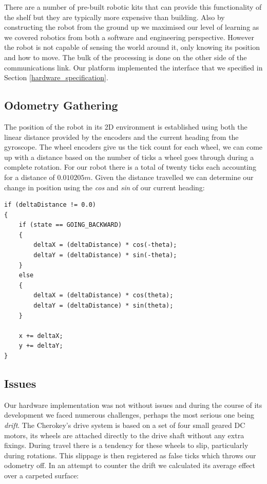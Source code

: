 \noindent
There are a number of pre-built robotic kits that can provide this functionality of the shelf but they are typically more expensive than building. Also by constructing the robot from the ground up we maximised our level of learning as we covered robotics from both a software and engineering perspective. However the robot is not capable of sensing the world around it, only knowing its position and how to move. The bulk of the processing is done on the other side of the communications link. Our platform implemented the interface that we specified in Section \ref{hardware_specification}.

\newpage

\subsection{Odometry Gathering}
\noindent
The position of the robot in its 2D environment is established using both the linear distance provided by the encoders and the current heading from the gyroscope. The wheel encoders give us the tick count for each wheel, we can come up with a distance based on the number of ticks a wheel goes through during a complete rotation. For our robot there is a total of twenty ticks each accounting for a distance of $0.010205m$. Given the distance travelled we can determine our change in position using the \textit{cos} and \textit{sin} of our current heading: \\

\begin{lstlisting}
if (deltaDistance != 0.0)
{
	if (state == GOING_BACKWARD)
	{
		deltaX = (deltaDistance) * cos(-theta);
		deltaY = (deltaDistance) * sin(-theta);
	}
	else
	{
		deltaX = (deltaDistance) * cos(theta);
		deltaY = (deltaDistance) * sin(theta);
	}

	x += deltaX;
	y += deltaY;
}
\end{lstlisting}

\newpage

\subsection{Issues}
\noindent
Our hardware implementation was not without issues and during the course of its development we faced numerous challenges, perhaps the most serious one being \textit{drift}. The Cherokey's drive system is based on a set of four small geared DC motors, its wheels are attached directly to the drive shaft without any extra fixings. During travel there is a tendency for these wheels to slip, particularly during rotations. This slippage is then registered as false ticks which throws our odometry off. In an attempt to counter the drift we calculated its average effect over a carpeted surface: \\

